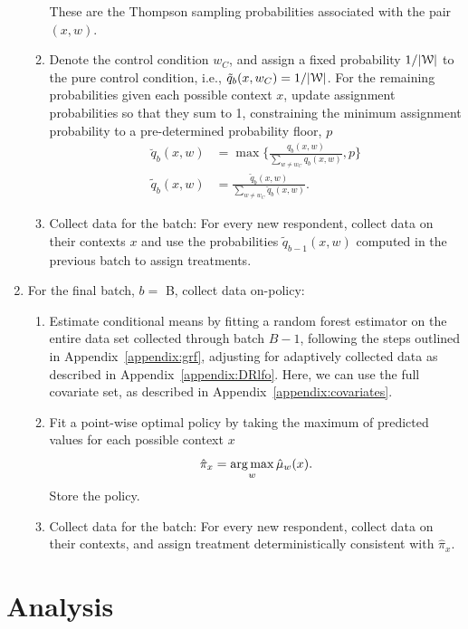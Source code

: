 \documentclass[letterpaper, 12pt, parskip=full,]{scrartcl}
\begin{document}
\begin{enumerate}
\begin{enumerate}
  These are the Thompson sampling probabilities associated with the pair $(x, w)$. 
  
  \item Denote the control condition $w_{C}$, and assign a fixed probability $1/|{\EuScript W}|$ to the pure control condition, i.e., $\tilde{q}_{b}(x, w_{C}) = 1/|{\EuScript W}|$. For the remaining probabilities given each possible context $x$, update assignment probabilities so that they sum to 1, constraining the minimum assignment probability to a pre-determined probability floor, $p$
  \begin{align}
  \breve{q}_{b}(x, w) & =\max\Biggr\{\frac{ q_{b}(x, w)}{\sum\limits_{w \neq w_{C}}q_{b}(x, w) } , p\Biggr\} \\
  \tilde{q}_{b}(x, w) & = \frac{ \breve q_{b}(x, w)}{\sum\limits_{w \neq w_{C}}\breve q_{b}(x, w) }. 
  \end{align}
  
  \item Collect data for the batch: For every new respondent, collect data on their contexts $x$ and use the probabilities $\tilde{q}_{b-1}(x, w)$ computed in the previous batch to assign treatments.
\end{enumerate}

\item For the final batch,  $b = $ B, collect data on-policy:
\begin{enumerate}
  \item Estimate conditional means by fitting a random forest estimator on the entire data set collected through batch $B-1$, following the steps outlined in Appendix~\ref{appendix:grf}, adjusting for adaptively collected data as described in Appendix~\ref{appendix:DRlfo}. Here, we can use the full covariate set, as described in Appendix~\ref{appendix:covariates}.
  \item Fit a point-wise optimal policy  by taking the maximum of predicted values for each possible context $x$ 
    \begin{equation}
     \hat{\pi}_{x} = \operatorname*{arg\,max}_{ w } \hat{\mu}_{w}(x) . 
    \end{equation} 
  Store the policy. 
  \item Collect data for the batch: For every new respondent, collect data on their contexts, and assign treatment deterministically consistent with $\hat{\pi}_{x}$. 
\end{enumerate}
\end{enumerate}


\section{Analysis}\label{analysis}
\end{document}

